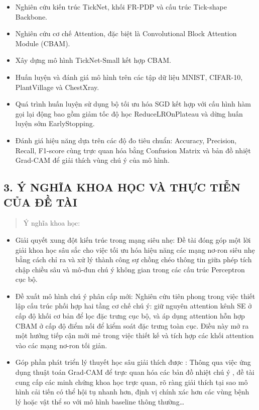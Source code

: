 \documentclass[
]{article}
\begin{document}
\begin{itemize}
\item
  Nghiên cứu kiến trúc TickNet, khối FR-PDP và cấu trúc Tick-shape
  Backbone.
\item
  Nghiên cứu cơ chế Attention, đặc biệt là Convolutional Block Attention
  Module (CBAM).
\item
  Xây dựng mô hình TickNet-Small kết hợp CBAM.
\item
  Huấn luyện và đánh giá mô hình trên các tập dữ liệu MNIST, CIFAR-10,
  PlantVillage và ChestXray.
\item
  Quá trình huấn luyện sử dụng bộ tối ưu hóa SGD kết hợp với cấu hình
  hàm gọi lại động bao gồm giảm tốc độ học ReduceLROnPlateau và dừng
  huấn luyện sớm EarlyStopping.
\item
  Đánh giá hiệu năng dựa trên các độ đo tiêu chuẩn: Accuracy, Precision,
  Recall, F1-score cùng trực quan hóa bằng Confusion Matrix và bản đồ
  nhiệt Grad-CAM để giải thích vùng chú ý của mô hình.
\end{itemize}

\subsection{3. Ý NGHĨA KHOA HỌC VÀ THỰC TIỄN CỦA ĐỀ TÀI}\label{3-y-nghia-khoa-hoc-va-thuc-tien-cua-de-tai}

\begin{quote}
Ý nghĩa khoa học:
\end{quote}

\begin{itemize}
\item
  Giải quyết xung đột kiến trúc trong mạng siêu nhẹ: Đề tài đóng góp một
  lời giải khoa học sâu sắc cho việc tối ưu hóa hiệu năng các mạng
  nơ-ron siêu nhẹ bằng cách chỉ ra và xử lý thành công sự chồng chéo
  thông tin giữa phép tích chập chiều sâu và mô-đun chú ý không gian
  trong các cấu trúc Perceptron cục bộ.
\item
  Đề xuất mô hình chú ý phân cấp mới: Nghiên cứu tiên phong trong việc
  thiết lập cấu trúc phối hợp hai tầng cơ chế chú ý: giữ nguyên
  attention kênh SE ở cấp độ khối cơ bản để lọc đặc trưng cục bộ, và áp
  dụng attention hỗn hợp CBAM ở cấp độ điểm nối để kiểm soát đặc trưng
  toàn cục. Điều này mở ra một hướng tiếp cận mới mẻ trong việc thiết kế
  và tích hợp các khối attention vào các mạng nơ-ron tối giản.
\item
  Góp phần phát triển lý thuyết học sâu giải thích được : Thông qua việc
  ứng dụng thuật toán Grad-CAM để trực quan hóa các bản đồ nhiệt chú ý ,
  đề tài cung cấp các minh chứng khoa học trực quan, rõ ràng giải thích
  tại sao mô hình cải tiến có thể hội tụ nhanh hơn, định vị chính xác
  hơn các vùng bệnh lý hoặc vật thể so với mô hình baseline thông
  thường\ldots{}
\end{itemize}
\end{document}
